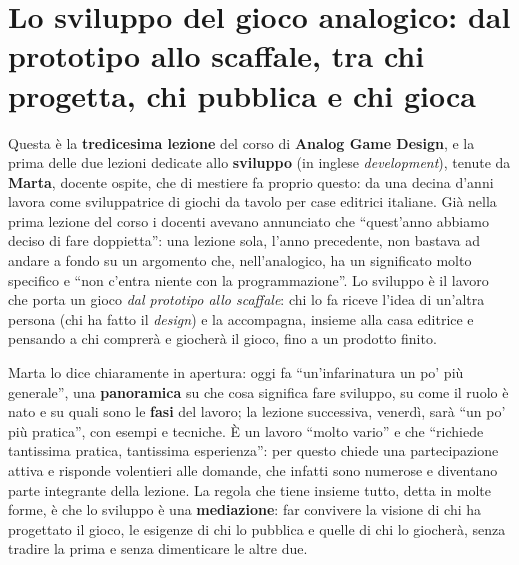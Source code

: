 \chapter[Lo sviluppo del gioco analogico]{Lo sviluppo del gioco analogico: dal
prototipo allo scaffale, tra chi progetta, chi pubblica e chi gioca}
\label{a13:cap:sviluppo}

Questa è la \textbf{tredicesima lezione} del corso di \textbf{Analog Game Design}, e la
prima delle due lezioni dedicate allo \textbf{sviluppo} (in inglese \emph{development}),
tenute da \textbf{Marta}, docente ospite, che di mestiere fa proprio questo: da una
decina d'anni lavora come sviluppatrice di giochi da tavolo per case editrici italiane.
Già nella prima lezione del corso i docenti avevano annunciato che ``quest'anno abbiamo
deciso di fare doppietta'': una lezione sola, l'anno precedente, non bastava ad andare a
fondo su un argomento che, nell'analogico, ha un significato molto specifico e ``non
c'entra niente con la programmazione''. Lo sviluppo è il lavoro che porta un gioco
\emph{dal prototipo allo scaffale}: chi lo fa riceve l'idea di un'altra persona (chi ha
fatto il \emph{design}) e la accompagna, insieme alla casa editrice e pensando a chi
comprerà e giocherà il gioco, fino a un prodotto finito.

Marta lo dice chiaramente in apertura: oggi fa ``un'infarinatura un po' più generale'',
una \textbf{panoramica} su che cosa significa fare sviluppo, su come il ruolo è nato e su
quali sono le \textbf{fasi} del lavoro; la lezione successiva, venerdì, sarà ``un po'
più pratica'', con esempi e tecniche. È un lavoro ``molto vario'' e che ``richiede
tantissima pratica, tantissima esperienza'': per questo chiede una partecipazione attiva
e risponde volentieri alle domande, che infatti sono numerose e diventano parte
integrante della lezione. La regola che tiene insieme tutto, detta in molte forme, è che
lo sviluppo è una \textbf{mediazione}: far convivere la visione di chi ha progettato il
gioco, le esigenze di chi lo pubblica e quelle di chi lo giocherà, senza tradire la
prima e senza dimenticare le altre due.

